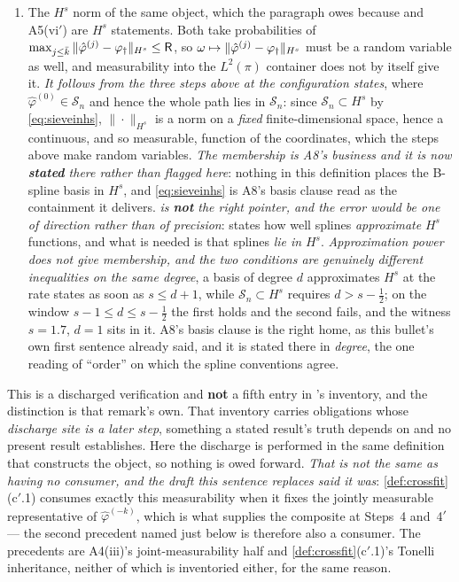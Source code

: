 \begin{enumerate}
\item[--] The $H^{s}$ norm of the same object, which the paragraph owes because  and
A5(vi$'$) are $H^{s}$ statements. Both take probabilities of
$\max_{j\le\bar k}\|\hat\varphi^{(j)}-\varphi_{\dagger}\|_{H^{s}}\le\mathsf R$, so
$\omega\mapsto\|\hat\varphi^{(j)}-\varphi_{\dagger}\|_{H^{s}}$ must be a random variable as well, and measurability
into the $L^{2}(\pi)$ container does not by itself give it. \emph{It follows from the three steps above at the
configuration  states}, where $\hat\varphi^{(0)}\in\mathcal S_n$ and hence the whole path
lies in $\mathcal S_n$: since $\mathcal S_n\subset H^{s}$ by \eqref{eq:sieveinhs}, $\|\cdot\|_{H^{s}}$ is a
norm on a \emph{fixed} finite-dimensional space, hence a continuous, and so measurable, function of the
coordinates, which the steps above make random variables. \emph{The membership is A8's business and it is now
\textbf{stated} there rather than flagged here}: nothing in this definition places the B-spline basis in
$H^{s}$, and \eqref{eq:sieveinhs} is A8's basis clause read as the containment it delivers.
\emph{ is \textbf{not} the right pointer, and the error would be one of direction
rather than of precision}:  states how well splines \emph{approximate}
$H^{s}$ functions, and what is needed is that splines \emph{lie in} $H^{s}$. \emph{Approximation power does
not give membership, and the two conditions are genuinely different inequalities on the same degree}, a
basis of degree $d$ approximates $H^{s}$ at the rate  states as soon as $s\le d+1$, while
$\mathcal S_n\subset H^{s}$ requires $d>s-\tfrac12$; on the window $s-1\le d\le s-\tfrac12$ the first holds
and the second fails, and the witness $s=1.7$, $d=1$ sits in it. A8's basis clause is the
right home, as this bullet's own first sentence already said, and it is stated there in \emph{degree}, the
one reading of ``order'' on which the spline conventions agree.
\end{enumerate}
This is a discharged verification and \textbf{not} a fifth entry in 's inventory,
and the distinction is that remark's own. That inventory carries obligations whose \emph{discharge site is a
later step}, something a stated result's truth depends on and no present result establishes. Here the
discharge is performed in the same definition that constructs the object, so nothing is owed forward.
\emph{That is not the same as having no consumer, and the draft this sentence replaces said it
was}: \cref{def:crossfit}\textup{(c$'$.1)} consumes exactly this measurability when it fixes the
jointly measurable representative of $\hat\varphi^{(-k)}$, which is what supplies the composite at
 Steps~4 and~4$'$ --- the second precedent named just below is therefore
also a consumer. The precedents are A4(iii)'s joint-measurability half and
\cref{def:crossfit}\textup{(c$'$.1)}'s Tonelli inheritance, neither of which is inventoried either, for the
same reason.

